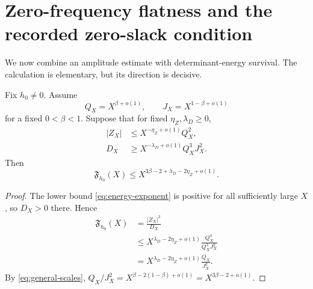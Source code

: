\section{Zero-frequency flatness and the recorded zero-slack condition}
\label{sec:zero-slack}

We now combine an amplitude estimate with determinant-energy survival.
The calculation is elementary, but its direction is decisive.

\begin{theorem}
\label{thm:general-exponent-transfer}
Fix \(h_0\ne0\).  Assume
\begin{equation}
 Q_X=X^{\beta+o(1)},
 \qquad
 J_X=X^{1-\beta+o(1)}
 \label{eq:general-scales}
\end{equation}
for a fixed \(0<\beta<1\).  Suppose that for fixed
\(\eta_Z,\lambda_D\ge0\),
\begin{align}
 |Z_X|
 &\le X^{-\eta_Z+o(1)}Q_X^2,
 \label{eq:zero-mode-exponent}\\
 D_X
 &\ge X^{-\lambda_D+o(1)}Q_X^3J_X^2.
 \label{eq:energy-exponent}
\end{align}
Then
\begin{equation}
 \boxed{\displaystyle
 \mathfrak F_{h_0}(X)
 \le
 X^{3\beta-2+\lambda_D-2\eta_Z+o(1)}.}
 \label{eq:general-flatness-transfer}
\end{equation}
\end{theorem}

\begin{proof}
The lower bound \eqref{eq:energy-exponent} is positive for all
sufficiently large \(X\), so \(D_X>0\) there.  Hence
\begin{align*}
 \mathfrak F_{h_0}(X)
 &=\frac{|Z_X|^2}{D_X}\\
 &\le
 X^{\lambda_D-2\eta_Z+o(1)}
 \frac{Q_X^4}{Q_X^3J_X^2}\\
 &=X^{\lambda_D-2\eta_Z+o(1)}
 \frac{Q_X}{J_X^2}.
\end{align*}
By \eqref{eq:general-scales},
\(Q_X/J_X^2=X^{\beta-2(1-\beta)+o(1)}
=X^{3\beta-2+o(1)}\).
\end{proof}

